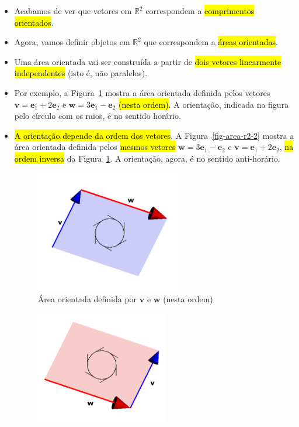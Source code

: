 \documentclass[
  letterpaper,
  DIV=11,
  numbers=noendperiod]{scrreprt}
\begin{document}
\begin{itemize}
\item
  Acabamos de ver que vetores em $\mathbb{R}^2$ correspondem a
  {\hl{comprimentos orientados}}.
\item
  Agora, vamos definir objetos em $\mathbb{R}^2$ que correspondem a
  {\hl{áreas orientadas}}.
\item
  Uma área orientada vai ser construída a partir de {\hl{dois vetores
  linearmente independentes}} (isto é, não paralelos).
\item
  Por exemplo, a Figura~\ref{fig-area-r2} mostra a área orientada
  definida pelos vetores $\mathbf{v} = \mathbf{e}_{1} + 2\mathbf{e}_{2}$
  e $\mathbf{w} = 3\mathbf{e}_{1} - \mathbf{e}_{2}$ {\hl{(nesta
  ordem)}}. A orientação, indicada na figura pelo círculo com os raios,
  é no sentido horário.
\item
  {\hl{A orientação depende da ordem dos vetores}}. A
  Figura~\ref{fig-area-r2-2} mostra a área orientada definida pelos
  {\hl{mesmos vetores}} $\mathbf{w} = 3\mathbf{e}_{1} - \mathbf{e}_{2}$
  e $\mathbf{v} = \mathbf{e}_{1} + 2\mathbf{e}_{2}$, {\hl{na ordem
  inversa}} da Figura~\ref{fig-area-r2}. A orientação, agora, é no
  sentido anti-horário.

  \begin{figure}[t]

  {\centering \includegraphics[width=0.6\textwidth,height=\textheight]{figures/fig-area-r2.png}

  }

  \caption{\label{fig-area-r2}Área orientada definida por $\mathbf{v}$ e
  $\mathbf{w}$ (nesta ordem)}

  \end{figure}

  \begin{figure}[t]

  {\centering \includegraphics[width=0.55\textwidth,height=\textheight]{figures/fig-area-r2-2.png}

}
\end{figure}
\end{itemize}
\end{document}

